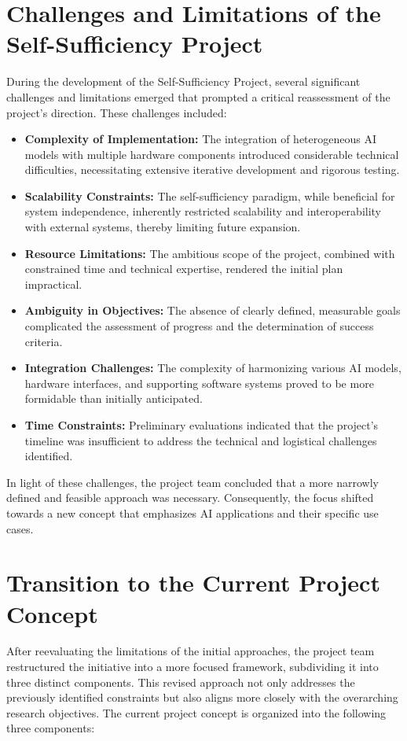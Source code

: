 \section{Challenges and Limitations of the Self-Sufficiency Project}

During the development of the Self-Sufficiency Project, several significant challenges and limitations emerged that prompted a critical reassessment of the project’s direction. These challenges included:
\begin{itemize}
    \item \textbf{Complexity of Implementation:} The integration of heterogeneous AI models with multiple hardware components introduced considerable technical difficulties, necessitating extensive iterative development and rigorous testing.
    \item \textbf{Scalability Constraints:} The self-sufficiency paradigm, while beneficial for system independence, inherently restricted scalability and interoperability with external systems, thereby limiting future expansion.
    \item \textbf{Resource Limitations:} The ambitious scope of the project, combined with constrained time and technical expertise, rendered the initial plan impractical.
    \item \textbf{Ambiguity in Objectives:} The absence of clearly defined, measurable goals complicated the assessment of progress and the determination of success criteria.
    \item \textbf{Integration Challenges:} The complexity of harmonizing various AI models, hardware interfaces, and supporting software systems proved to be more formidable than initially anticipated.
    \item \textbf{Time Constraints:} Preliminary evaluations indicated that the project’s timeline was insufficient to address the technical and logistical challenges identified.
\end{itemize}

In light of these challenges, the project team concluded that a more narrowly defined and feasible approach was necessary. Consequently, the focus shifted towards a new concept that emphasizes AI applications and their specific use cases.

\section{Transition to the Current Project Concept}

After reevaluating the limitations of the initial approaches, the project team restructured the initiative into a more focused framework, subdividing it into three distinct components. This revised approach not only addresses the previously identified constraints but also aligns more closely with the overarching research objectives. The current project concept is organized into the following three components:


